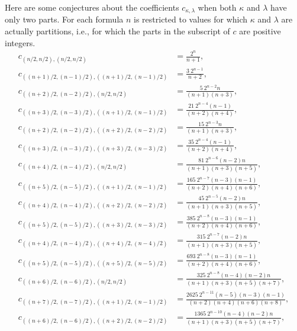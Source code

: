\documentclass[10pt,oneside,american]{amsart}
\numberwithin{equation}{section}
\numberwithin{figure}{section}
\theoremstyle{definition}
\theoremstyle{remark}
\theoremstyle{plain}
\theoremstyle{definition}
\theoremstyle{plain}
\begin{document}
\newpage
Here are some conjectures about the coefficients $c_{\kappa,\lambda}$ when
both $\kappa$ and $\lambda$ have only two parts. For each formula $n$ is
restricted to values for which $\kappa$ and $\lambda$ are actually partitions,
i.e., for which the parts in the subscript of $c$ are positive integers.
\begin{align*}
c_{\left(n/2,n/2\right),\left(n/2,n/2\right)} &= \frac{2^n}{n+1}, \\
c_{\left((n+1)/2,(n-1)/2\right),\left((n+1)/2,(n-1)/2\right)} &= \frac{3\ 2^{n-1}}{n+2}, \\
c_{\left((n+2)/2,(n-2)/2\right),\left(n/2,n/2\right)} &= \frac{5\ 2^{n-2} n}{(n+1) (n+3)}, \\
c_{\left((n+3)/2,(n-3)/2\right),\left((n+1)/2,(n-1)/2\right)} &= \frac{21\ 2^{n-4} (n-1)}{(n+2) (n+4)}, \\
c_{\left((n+2)/2,(n-2)/2\right),\left((n+2)/2,(n-2)/2\right)} &= \frac{15\ 2^{n-3} n}{(n+1) (n+3)}, \\
c_{\left((n+3)/2,(n-3)/2\right),\left((n+3)/2,(n-3)/2\right)} &= \frac{35\ 2^{n-4} (n-1)}{(n+2) (n+4)}, \\
c_{\left((n+4)/2,(n-4)/2\right),\left(n/2,n/2\right)} &= \frac{81\ 2^{n-6} (n-2) n}{(n+1) (n+3) (n+5)}, \\
c_{\left((n+5)/2,(n-5)/2\right),\left((n+1)/2,(n-1)/2\right)} &= \frac{165\ 2^{n-7} (n-3) (n-1)}{(n+2) (n+4) (n+6)}, \\
c_{\left((n+4)/2,(n-4)/2\right),\left((n+2)/2,(n-2)/2\right)} &= \frac{45\ 2^{n-5} (n-2) n}{(n+1) (n+3) (n+5)}, \\
c_{\left((n+5)/2,(n-5)/2\right),\left((n+3)/2,(n-3)/2\right)} &= \frac{385\ 2^{n-8} (n-3) (n-1)}{(n+2) (n+4) (n+6)}, \\
c_{\left((n+4)/2,(n-4)/2\right),\left((n+4)/2,(n-4)/2\right)} &= \frac{315\ 2^{n-7} (n-2) n}{(n+1) (n+3) (n+5)}, \\
c_{\left((n+5)/2,(n-5)/2\right),\left((n+5)/2,(n-5)/2\right)} &= \frac{693\ 2^{n-8} (n-3) (n-1)}{(n+2) (n+4) (n+6)}, \\
c_{\left((n+6)/2,(n-6)/2\right),\left(n/2,n/2\right)} &= \frac{325\ 2^{n-8} (n-4) (n-2) n}{(n+1) (n+3) (n+5) (n+7)}, \\
c_{\left((n+7)/2,(n-7)/2\right),\left((n+1)/2,(n-1)/2\right)} &= \frac{2625\ 2^{n-11} (n-5) (n-3) (n-1)}{(n+2) (n+4) (n+6) (n+8)}, \\
c_{\left((n+6)/2,(n-6)/2\right),\left((n+2)/2,(n-2)/2\right)} &= \frac{1365\ 2^{n-10} (n-4) (n-2) n}{(n+1) (n+3) (n+5) (n+7)}, \\

\end{align*}
\end{document}
